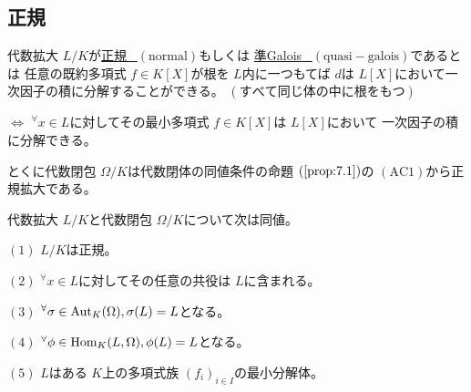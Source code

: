 \documentclass[../master_galois_theory]{subfiles}
\begin{document}
\subsection{正規}

\begin{defi}
  代数拡大 $L/K$が\underline{正規 \  $(\mathrm{normal})$}もしくは
  \underline{準\rm{Galois} \  $(\mathrm{quasi-galois})$}であるとは
  任意の既約多項式 $f \in K[X]$が根を $L$内に一つもてば
  $d$は $L[X]$において一次因子の積に分解することができる。
  $(すべて同じ体の中に根をもつ)$

  $\Leftrightarrow$
  ${}^\forall x \in L$に対してその最小多項式 $f \in K[X]$は $L[X]$において
  一次因子の積に分解できる。

  とくに代数閉包 $\Omega/K$は代数閉体の同値条件の命題 $(\mathrm{\ref{prop:7.1}})$の $(\mathrm{AC}1)$から正規拡大である。
\end{defi}

\begin{prop} \label{prop:11.1}
  代数拡大 $L/K$と代数閉包 $\Omega/K$について次は同値。

  $(1)$
  $L/K$は正規。

  $(2)$
  ${}^\forall x \in L$に対してその任意の共役は $L$に含まれる。

  $(3)$
  ${}^\forall \sigma \in \mathrm{Aut}_K(\Omega) , \sigma(L) = L$となる。

  $(4)$
  ${}^\forall \phi \in \mathrm{Hom}_K(L,\Omega) , \phi(L) = L$となる。

  $(5)$
  $L$はある $K$上の多項式族 $(f_i)_{i \in I}$の最小分解体。
\end{prop}
\end{document}
